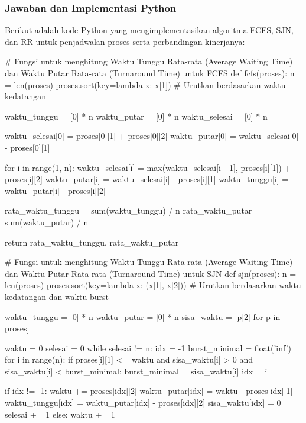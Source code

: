 \documentclass[12pt]{article}
\begin{document}
\subsubsection{Jawaban dan Implementasi Python}

Berikut adalah kode Python yang mengimplementasikan algoritma FCFS, SJN, dan RR untuk penjadwalan proses serta perbandingan kinerjanya:

\begin{python}
# Fungsi untuk menghitung Waktu Tunggu Rata-rata (Average Waiting Time) dan Waktu Putar Rata-rata (Turnaround Time) untuk FCFS
def fcfs(proses):
    n = len(proses)
    proses.sort(key=lambda x: x[1])  # Urutkan berdasarkan waktu kedatangan

    waktu_tunggu = [0] * n
    waktu_putar = [0] * n
    waktu_selesai = [0] * n

    waktu_selesai[0] = proses[0][1] + proses[0][2]
    waktu_putar[0] = waktu_selesai[0] - proses[0][1]
    
    for i in range(1, n):
        waktu_selesai[i] = max(waktu_selesai[i - 1], proses[i][1]) + proses[i][2]
        waktu_putar[i] = waktu_selesai[i] - proses[i][1]
        waktu_tunggu[i] = waktu_putar[i] - proses[i][2]

    rata_waktu_tunggu = sum(waktu_tunggu) / n
    rata_waktu_putar = sum(waktu_putar) / n

    return rata_waktu_tunggu, rata_waktu_putar

# Fungsi untuk menghitung Waktu Tunggu Rata-rata (Average Waiting Time) dan Waktu Putar Rata-rata (Turnaround Time) untuk SJN
def sjn(proses):
    n = len(proses)
    proses.sort(key=lambda x: (x[1], x[2]))  # Urutkan berdasarkan waktu kedatangan dan waktu burst

    waktu_tunggu = [0] * n
    waktu_putar = [0] * n
    sisa_waktu = [p[2] for p in proses]

    waktu = 0
    selesai = 0
    while selesai != n:
        idx = -1
        burst_minimal = float('inf')
        for i in range(n):
            if proses[i][1] <= waktu and sisa_waktu[i] > 0 and sisa_waktu[i] < burst_minimal:
                burst_minimal = sisa_waktu[i]
                idx = i
        
        if idx != -1:
            waktu += proses[idx][2]
            waktu_putar[idx] = waktu - proses[idx][1]
            waktu_tunggu[idx] = waktu_putar[idx] - proses[idx][2]
            sisa_waktu[idx] = 0
            selesai += 1
        else:
            waktu += 1


\end{python}
\end{document}
